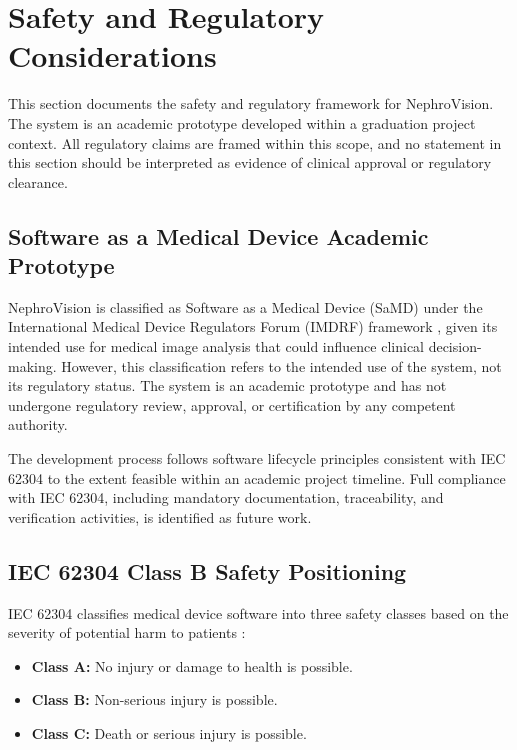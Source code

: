 \section{Safety and Regulatory Considerations}

This section documents the safety and regulatory framework for NephroVision. The system is an academic prototype developed within a graduation project context. All regulatory claims are framed within this scope, and no statement in this section should be interpreted as evidence of clinical approval or regulatory clearance.

\subsection{Software as a Medical Device Academic Prototype}

NephroVision is classified as Software as a Medical Device (SaMD) under the International Medical Device Regulators Forum (IMDRF) framework \cite{imdrf_samd}, given its intended use for medical image analysis that could influence clinical decision-making. However, this classification refers to the intended use of the system, not its regulatory status. The system is an academic prototype and has not undergone regulatory review, approval, or certification by any competent authority.

The development process follows software lifecycle principles consistent with IEC 62304 \cite{iec62304} to the extent feasible within an academic project timeline. Full compliance with IEC 62304, including mandatory documentation, traceability, and verification activities, is identified as future work.

\subsection{IEC 62304 Class B Safety Positioning}

IEC 62304 classifies medical device software into three safety classes based on the severity of potential harm to patients \cite{iec62304}:

\begin{itemize}
    \item \textbf{Class A:} No injury or damage to health is possible.
    \item \textbf{Class B:} Non-serious injury is possible.
    \item \textbf{Class C:} Death or serious injury is possible.
\end{itemize}

